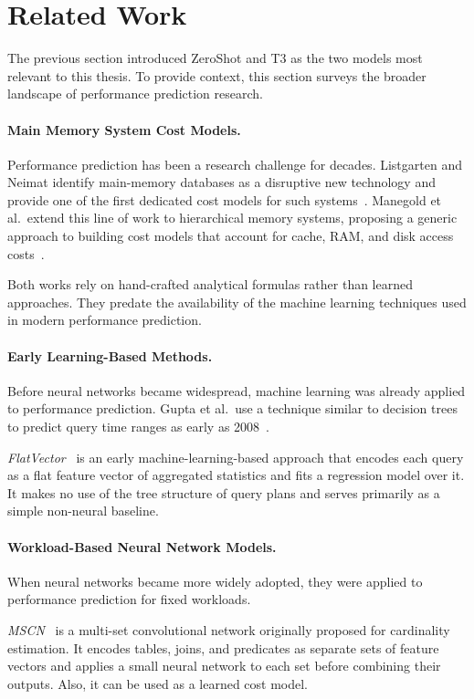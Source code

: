 \section{Related Work}

The previous section introduced ZeroShot and T3 as the two models most relevant to this thesis.
To provide context, this section surveys the broader landscape of performance prediction research.

\paragraph{Main Memory System Cost Models.}
Performance prediction has been a research challenge for decades.
Listgarten and Neimat identify main-memory databases as a disruptive new technology and provide one of the first dedicated cost models for such systems~\parencite{listgarten}.
Manegold et al.\ extend this line of work to hierarchical memory systems, proposing a generic approach to building cost models that account for cache, RAM, and disk access costs~\parencite{manegold}.

Both works rely on hand-crafted analytical formulas rather than learned approaches.
They predate the availability of the machine learning techniques used in modern performance prediction.

\paragraph{Early Learning-Based Methods.}
Before neural networks became widespread, machine learning was already applied to performance prediction.
Gupta et al.\ use a technique similar to decision trees to predict query time ranges as early as 2008~\parencite{pqr}.

\textit{FlatVector}~\parencite{flatvector} is an early machine-learning-based approach
that encodes each query as a flat feature vector of aggregated statistics
and fits a regression model over it.
It makes no use of the tree structure of query plans
and serves primarily as a simple non-neural baseline.

\paragraph{Workload-Based Neural Network Models.}
When neural networks became more widely adopted, they were applied to performance prediction for fixed workloads.

\textit{MSCN}~\parencite{mscn} is a multi-set convolutional network originally proposed for cardinality estimation.
It encodes tables, joins, and predicates as separate sets of feature vectors
and applies a small neural network to each set before combining their outputs.
Also, it can be used as a learned cost model.

